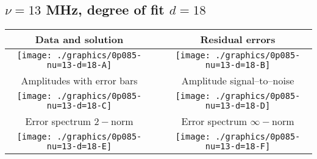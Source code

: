 

% 

\clearpage{}
\break{}

\subsection{$\nu = 13$ MHz, degree of fit $d = 18$}

\begin{table}[h]
    \begin{center}
        \begin{tabular}{ccc}
            Data and solution & \quad & Residual errors \\\hline
            \texttt{[image: ./graphics/0p085-nu=13-d=18-A]} &&
            \texttt{[image: ./graphics/0p085-nu=13-d=18-B]} \\[15pt]
            Amplitudes with error bars && Amplitude signal--to--noise \\\hline
            \texttt{[image: ./graphics/0p085-nu=13-d=18-C]} &&
            \texttt{[image: ./graphics/0p085-nu=13-d=18-D]} \\[15pt]
            Error spectrum $2-$norm && Error spectrum $\infty-$norm \\\hline
            \texttt{[image: ./graphics/0p085-nu=13-d=18-E]} &&
            \texttt{[image: ./graphics/0p085-nu=13-d=18-F]} \\[15pt]
        \end{tabular}
    \end{center}
\label{fig:elev=85, nu=13}
\end{table}



\endinput
